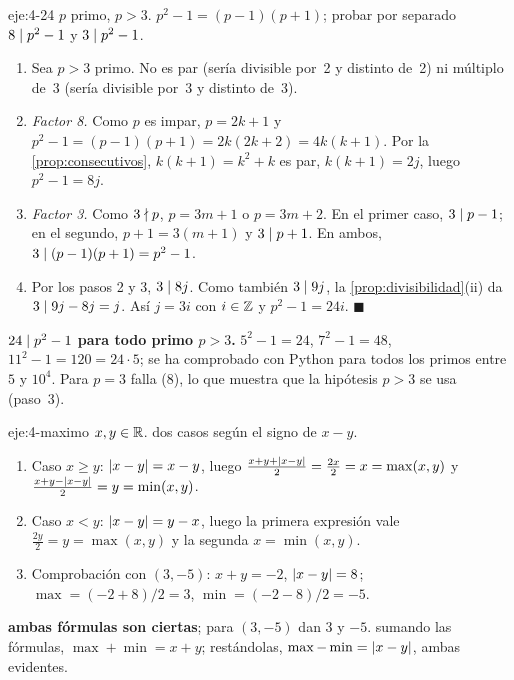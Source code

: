 \begin{solucion}{eje:4-24}
\datos $p$ primo, $p>3$.
\planteamiento $p^{2}-1=(p-1)(p+1)$; probar por separado $8\mid p^{2}-1$ y $3\mid p^{2}-1$.
\pasos
\begin{enumerate}[label=\arabic*.]
  \item Sea $p>3$ primo. No es par (sería divisible por~2 y distinto de~2) ni múltiplo de~3 (sería divisible por~3 y distinto de~3).
  \item \emph{Factor 8.} Como $p$ es impar, $p=2k+1$ y $p^{2}-1=(p-1)(p+1)=2k(2k+2)=4k(k+1)$. Por la \cref{prop:consecutivos}, $k(k+1)=k^{2}+k$ es par, $k(k+1)=2j$, luego $p^{2}-1=8j$.
  \item \emph{Factor 3.} Como $3\nmid p$, $p=3m+1$ o $p=3m+2$. En el primer caso, $3\mid p-1$; en el segundo, $p+1=3(m+1)$ y $3\mid p+1$. En ambos, $3\mid(p-1)(p+1)=p^{2}-1$.
  \item Por los pasos 2 y 3, $3\mid 8j$. Como también $3\mid 9j$, la \cref{prop:divisibilidad}(ii) da $3\mid 9j-8j=j$. Así $j=3i$ con $i\in\mathbb{Z}$ y $p^{2}-1=24i$. $\blacksquare$
\end{enumerate}
\resultado \textbf{$24\mid p^{2}-1$ para todo primo $p>3$.}
\comprobacion $5^{2}-1=24$, $7^{2}-1=48$, $11^{2}-1=120=24\cdot 5$; se ha comprobado con Python para todos los primos entre $5$ y $10^{4}$. Para $p=3$ falla ($8$), lo que muestra que la hipótesis $p>3$ se usa (paso~3).
\end{solucion}

\begin{solucion}{eje:4-maximo}
\datos $x,y\in\mathbb{R}$.
\planteamiento dos casos según el signo de $x-y$.
\pasos
\begin{enumerate}[label=\arabic*.]
  \item Caso $x\ge y$: $\lvert x-y\rvert=x-y$, luego $\frac{x+y+\lvert x-y\rvert}{2}=\frac{2x}{2}=x=\max(x,y)$ y $\frac{x+y-\lvert x-y\rvert}{2}=y=\min(x,y)$.
  \item Caso $x<y$: $\lvert x-y\rvert=y-x$, luego la primera expresión vale $\frac{2y}{2}=y=\max(x,y)$ y la segunda $x=\min(x,y)$.
  \item Comprobación con $(3,-5)$: $x+y=-2$, $\lvert x-y\rvert=8$; $\max=(-2+8)/2=3$, $\min=(-2-8)/2=-5$.
\end{enumerate}
\resultado \textbf{ambas fórmulas son ciertas}; para $(3,-5)$ dan $3$ y $-5$.
\comprobacion sumando las fórmulas, $\max+\min=x+y$; restándolas, $\max-\min=\lvert x-y\rvert$, ambas evidentes.
\end{solucion}

